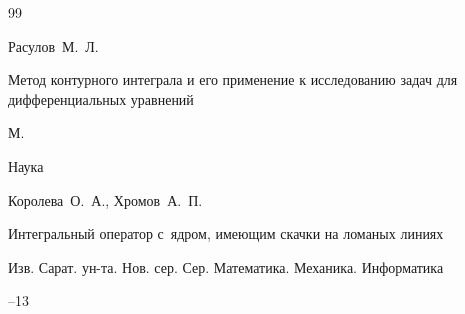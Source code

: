 \begin{thebibliography}{99}





















\by Расулов~М.~Л.

\book   Метод контурного интеграла и его применение к исследованию задач для дифференциальных уравнений 

\publaddr М.

\publ  Наука







\by Королева~О.~А., Хромов~А.~П.

\paper Интегральный оператор с~ядром, имеющим скачки на ломаных линиях

\jour Изв. Сарат. ун-та. Нов. сер. Сер. Математика. Механика. Информатика




--13








\end{thebibliography}





